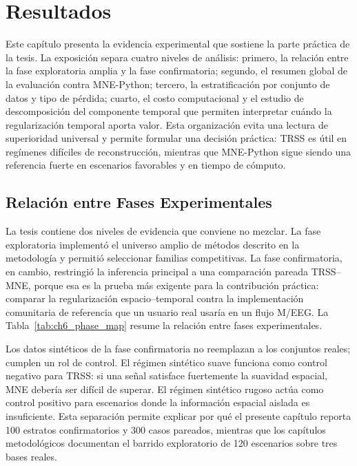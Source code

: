 \chapter{Resultados} %
\label{ch:resultados}

Este capítulo presenta la evidencia experimental que sostiene la parte práctica de la tesis. La exposición separa cuatro niveles de análisis: primero, la relación entre la fase exploratoria amplia y la fase confirmatoria; segundo, el resumen global de la evaluación contra MNE-Python; tercero, la estratificación por conjunto de datos y tipo de pérdida; cuarto, el costo computacional y el estudio de descomposición del componente temporal que permiten interpretar cuándo la regularización temporal aporta valor. Esta organización evita una lectura de superioridad universal y permite formular una decisión práctica: TRSS es útil en regímenes difíciles de reconstrucción, mientras que MNE-Python sigue siendo una referencia fuerte en escenarios favorables y en tiempo de cómputo.

\section{Relación entre Fases Experimentales}

La tesis contiene dos niveles de evidencia que conviene no mezclar. La fase exploratoria implementó el universo amplio de métodos descrito en la metodología y permitió seleccionar familias competitivas. La fase confirmatoria, en cambio, restringió la inferencia principal a una comparación pareada TRSS--MNE, porque esa es la prueba más exigente para la contribución práctica: comparar la regularización espacio--temporal contra la implementación comunitaria de referencia que un usuario real usaría en un flujo M/EEG. La Tabla~\ref{tab:ch6_phase_map} resume la relación entre fases experimentales.


Los datos sintéticos de la fase confirmatoria no reemplazan a los conjuntos reales; cumplen un rol de control. El régimen sintético suave funciona como control negativo para TRSS: si una señal satisface fuertemente la suavidad espacial, MNE debería ser difícil de superar. El régimen sintético rugoso actúa como control positivo para escenarios donde la información espacial aislada es insuficiente. Esta separación permite explicar por qué el presente capítulo reporta 100 estratos confirmatorios y 300 casos pareados, mientras que los capítulos metodológicos documentan el barrido exploratorio de 120 escenarios sobre tres bases reales.

